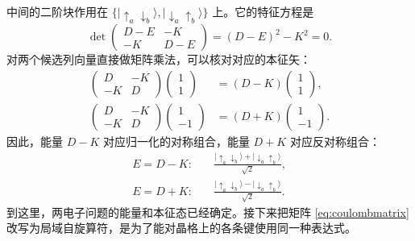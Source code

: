 \documentclass[UTF8,11pt,a4paper,fontset=fandol]{ctexart}
\newcommand{\ket}[1]{\lvert #1\rangle}
\begin{document}
中间的二阶块作用在 $\{\ket{\uparrow_a\downarrow_b},\ket{\downarrow_a\uparrow_b}\}$ 上。它的特征方程是
\begin{equation}
\det\begin{pmatrix}D-E&-K\\-K&D-E\end{pmatrix}
=(D-E)^2-K^2=0.
\end{equation}
对两个候选列向量直接做矩阵乘法，可以核对对应的本征矢：
\begin{equation}
\begin{aligned}
\begin{pmatrix}D&-K\\-K&D\end{pmatrix}
\begin{pmatrix}1\\1\end{pmatrix}
&=(D-K)\begin{pmatrix}1\\1\end{pmatrix},\\
\begin{pmatrix}D&-K\\-K&D\end{pmatrix}
\begin{pmatrix}1\\-1\end{pmatrix}
&=(D+K)\begin{pmatrix}1\\-1\end{pmatrix}.
\end{aligned}
\end{equation}
因此，能量 $D-K$ 对应归一化的对称组合，能量 $D+K$ 对应反对称组合：
\begin{equation}
\begin{aligned}
E=D-K:\quad&
\frac{\ket{\uparrow_a\downarrow_b}+\ket{\downarrow_a\uparrow_b}}{\sqrt2},\\
E=D+K:\quad&
\frac{\ket{\uparrow_a\downarrow_b}-\ket{\downarrow_a\uparrow_b}}{\sqrt2}.
\end{aligned}
\label{eq:paireigen}
\end{equation}
到这里，两电子问题的能量和本征态已经确定。接下来把矩阵 \eqref{eq:coulombmatrix} 改写为局域自旋算符，是为了能对晶格上的各条键使用同一种表达式。
\end{document}

